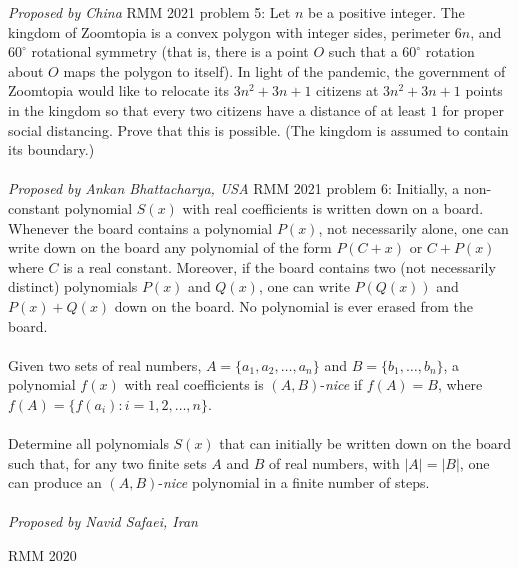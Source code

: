 \textit{Proposed by China} 
RMM 2021 problem 5:  Let \(n\) be a positive integer. The kingdom of Zoomtopia is a convex polygon with integer sides, perimeter \(6n\), and \(60^\circ\) rotational symmetry (that is, there is a point \(O\) such that a \(60^\circ\) rotation about \(O\) maps the polygon to itself). In light of the pandemic, the government of Zoomtopia would like to relocate its \(3n^2+3n+1\) citizens at \(3n^2+3n+1\) points in the kingdom so that every two citizens have a distance of at least \(1\) for proper social distancing. Prove that this is possible. (The kingdom is assumed to contain its boundary.) \\\\
\textit{Proposed by Ankan Bhattacharya, USA} 
RMM 2021 problem 6:  Initially, a non-constant polynomial $S(x)$ with real coefficients is written down on a board. Whenever the board contains a polynomial $P(x)$, not necessarily alone, one can write down on the board any polynomial of the form $P(C + x)$ or $C + P(x)$ where $C$ is a real constant. Moreover, if the board contains two (not necessarily distinct) polynomials $P(x)$ and $Q(x)$, one can write $P(Q(x))$ and $P(x) + Q(x)$ down on the board. No polynomial is ever erased from the board. \\\\
Given two sets of real numbers, $A = \{ a_1, a_2, \dots, a_n \}$ and $B = \{ b_1, \dots, b_n \}$, a polynomial $f(x)$ with real coefficients is $(A,B)$-\textit{nice} if $f(A) = B$, where $f(A) = \{ f(a_i) : i = 1, 2, \dots, n \}$. \\\\
Determine all polynomials $S(x)$ that can initially be written down on the board such that, for any two finite sets $A$ and $B$ of real numbers, with $|A| = |B|$, one can produce an $(A,B)$-\textit{nice} polynomial in a finite number of steps. \\\\
\textit{Proposed by Navid Safaei, Iran} 

RMM 2020 

